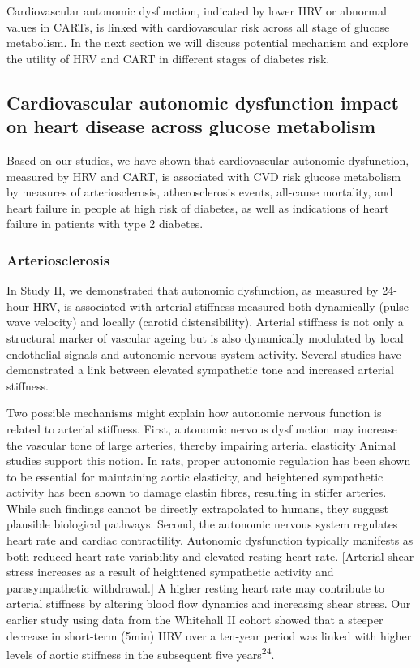 \documentclass[
  a4paper,
  headsepline=true,
  open=any]{scrbook}
\begin{document}
Cardiovascular autonomic dysfunction, indicated by lower HRV or abnormal
values in CARTs, is linked with cardiovascular risk across all stage of
glucose metabolism. In the next section we will discuss potential
mechanism and explore the utility of HRV and CART in different stages of
diabetes risk.

\hypertarget{cardiovascular-autonomic-dysfunction-impact-on-heart-disease-across-glucose-metabolism}{%
\subsection{Cardiovascular autonomic dysfunction impact on heart disease
across glucose
metabolism}\label{cardiovascular-autonomic-dysfunction-impact-on-heart-disease-across-glucose-metabolism}}

Based on our studies, we have shown that cardiovascular autonomic
dysfunction, measured by HRV and CART, is associated with CVD risk
glucose metabolism by measures of arteriosclerosis, atherosclerosis
events, all-cause mortality, and heart failure in people at high risk of
diabetes, as well as indications of heart failure in patients with type
2 diabetes.

\hypertarget{arteriosclerosis-1}{%
\subsubsection{Arteriosclerosis}\label{arteriosclerosis-1}}

In Study II, we demonstrated that autonomic dysfunction, as measured by
24-hour HRV, is associated with arterial stiffness measured both
dynamically (pulse wave velocity) and locally (carotid distensibility).
Arterial stiffness is not only a structural marker of vascular ageing
but is also dynamically modulated by local endothelial signals and
autonomic nervous system activity. Several studies have demonstrated a
link between elevated sympathetic tone and increased arterial stiffness.

Two possible mechanisms might explain how autonomic nervous function is
related to arterial stiffness. First, autonomic nervous dysfunction may
increase the vascular tone of large arteries, thereby impairing arterial
elasticity Animal studies support this notion. In rats, proper autonomic
regulation has been shown to be essential for maintaining aortic
elasticity, and heightened sympathetic activity has been shown to damage
elastin fibres, resulting in stiffer arteries. While such findings
cannot be directly extrapolated to humans, they suggest plausible
biological pathways. Second, the autonomic nervous system regulates
heart rate and cardiac contractility. Autonomic dysfunction typically
manifests as both reduced heart rate variability and elevated resting
heart rate. {[}Arterial shear stress increases as a result of heightened
sympathetic activity and parasympathetic withdrawal.{]} A higher resting
heart rate may contribute to arterial stiffness by altering blood flow
dynamics and increasing shear stress. Our earlier study using data from
the Whitehall II cohort showed that a steeper decrease in short-term
(5min) HRV over a ten-year period was linked with higher levels of
aortic stiffness in the subsequent five years\textsuperscript{24}.
\end{document}
